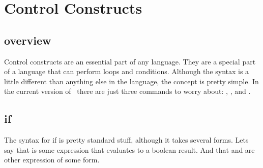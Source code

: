 %
%
\chapter{Control Constructs}

\section{overview}

Control constructs are an essential part of any language.  They are a special part of a language that can perform loops and conditions.  Although the syntax is a little different than anything else in the language, the concept is pretty simple.  In the current version of \SSquared\ there are just three commands to worry about: , , and .

\section{if}

The syntax for if is pretty standard stuff, although it takes several forms.  Lets say that  is some expression that evaluates to a boolean result.  And that  and  are other expression of some form.

\begin{SSCodeBox}
\scitea{} \\
\scitea{} \\
 \\
\scitea{} \\
\scitea{} \\
 \\
\scitea{\{} \\
\scitea{\hspace*{4em}}
\scitea{} \\
\scitea{\hspace*{4em}}
\scitea{} \\
 \\
 \\
\scitea{\}}
\end{SSCodeBox}

